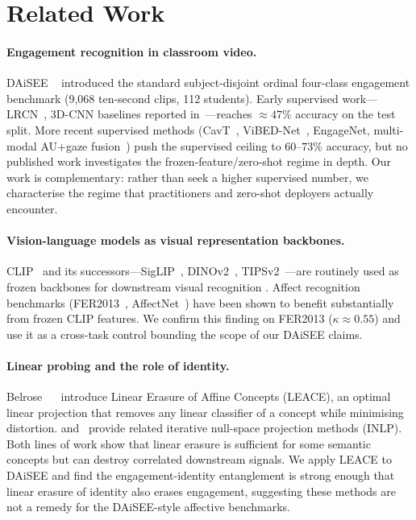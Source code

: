 \section{Related Work}
\label{sec:related}

\paragraph{Engagement recognition in classroom video.} DAiSEE
~\cite{gupta2016daisee} introduced the standard subject-disjoint
ordinal four-class engagement benchmark (9,068 ten-second clips,
112 students). Early supervised work---LRCN~\cite{donahue2015lrcn},
3D-CNN baselines reported in~\cite{gupta2016daisee}---reaches
$\approx 47\%$ accuracy on the test split. More recent supervised
methods (CavT~\cite{ai2022cavt}, ViBED-Net~\cite{abedi2021vibednet},
EngageNet, multi-modal AU+gaze fusion~\cite{abedi2021affect}) push
the supervised ceiling to $60$--$73\%$ accuracy, but no published
work investigates the frozen-feature/zero-shot regime in depth. Our
work is complementary: rather than seek a higher supervised number,
we characterise the regime that practitioners and zero-shot
deployers actually encounter.

\paragraph{Vision-language models as visual representation
backbones.} CLIP~\cite{radford2021clip} and its
successors---SigLIP~\cite{zhai2023siglip},
DINOv2~\cite{oquab2023dinov2}, TIPSv2~\cite{cao2026tipsv2}---are
routinely used as frozen backbones for downstream visual recognition
\cite{wortsman2022robust,kumar2022finetuning}. Affect recognition
benchmarks (FER2013~\cite{goodfellow2013fer2013},
AffectNet~\cite{mollahosseini2017affectnet}) have been shown to
benefit substantially from frozen CLIP features. We confirm this
finding on FER2013 ($\kappa \approx 0.55$) and use it as a
cross-task control bounding the scope of our DAiSEE claims.

\paragraph{Linear probing and the role of identity.} Belrose
~\etal~\cite{belrose2023leace} introduce Linear Erasure of Affine
Concepts (LEACE), an optimal linear projection that removes any
linear classifier of a concept while minimising distortion.
\cite{ravfogel2020rlace} and~\cite{ravfogel2022linear} provide
related iterative null-space projection methods (INLP). Both lines
of work show that linear erasure is sufficient for some semantic
concepts but can destroy correlated downstream signals. We apply
LEACE to DAiSEE and find the engagement-identity entanglement is
strong enough that linear erasure of identity also erases
engagement, suggesting these methods are not a remedy for the
DAiSEE-style affective benchmarks.

